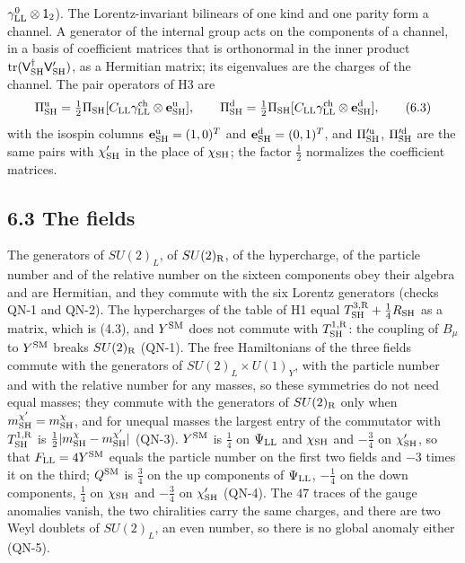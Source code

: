 \documentclass[
  10pt,
]{article}
\begin{document}
\(\gamma^0_{\rm LL}\otimes\mathsf 1_2\)). The Lorentz-invariant
bilinears of one kind and one parity form a channel. A generator of the
internal group acts on the components of a channel, in a basis of
coefficient matrices that is orthonormal in the inner product
\(\mathrm{tr}(\mathsf V^\dagger_{\rm SH}\mathsf V'_{\rm SH})\), as a
Hermitian matrix; its eigenvalues are the charges of the channel. The
pair operators of H3 are
\[\Pi^{\rm u}_{\rm SH}=\tfrac12\Pi_{\rm SH}[C_{\rm LL}\gamma^{\rm ch}_{\rm LL}\otimes\mathbf e^{\rm u}_{\rm SH}],\qquad
\Pi^{\rm d}_{\rm SH}=\tfrac12\Pi_{\rm SH}[C_{\rm LL}\gamma^{\rm ch}_{\rm LL}\otimes\mathbf e^{\rm d}_{\rm SH}],\tag{6.3}\]
with the isospin columns \(\mathbf e^{\rm u}_{\rm SH}=(1,0)^T\) and
\(\mathbf e^{\rm d}_{\rm SH}=(0,1)^T\), and \(\Pi'^{\rm u}_{\rm SH}\),
\(\Pi'^{\rm d}_{\rm SH}\) are the same pairs with \(\chi'_{\rm SH}\) in
the place of \(\chi_{\rm SH}\); the factor \(\tfrac12\) normalizes the
coefficient matrices.

\hypertarget{the-fields}{%
\subsection{6.3 The fields}\label{the-fields}}

The generators of \(SU(2)_L\), of \(SU(2)_{\rm R}\), of the hypercharge,
of the particle number and of the relative number on the sixteen
components obey their algebra and are Hermitian, and they commute with
the six Lorentz generators (checks QN-1 and QN-2). The hypercharges of
the table of H1 equal \(T^{3,{\rm R}}_{\rm SH}+\tfrac14R_{\rm SH}\) as a
matrix, which is (4.3), and \(Y^{\rm SM}\) does not commute with
\(T^{1,{\rm R}}_{\rm SH}\): the coupling of \(B_\mu\) to \(Y^{\rm SM}\)
breaks \(SU(2)_{\rm R}\) (QN-1). The free Hamiltonians of the three
fields commute with the generators of \(SU(2)_L\times U(1)_Y\), with the
particle number and with the relative number for any masses, so these
symmetries do not need equal masses; they commute with the generators of
\(SU(2)_{\rm R}\) only when \(m^{\chi'}_{\rm SH}=m^\chi_{\rm SH}\), and
for unequal masses the largest entry of the commutator with
\(T^{1,{\rm R}}_{\rm SH}\) is
\(\tfrac12\lvert m^\chi_{\rm SH}-m^{\chi'}_{\rm SH}\rvert\) (QN-3).
\(Y^{\rm SM}\) is \(\tfrac14\) on \(\Psi_{\rm LL}\) and
\(\chi_{\rm SH}\) and \(-\tfrac34\) on \(\chi'_{\rm SH}\), so that
\(F_{\rm LL}=4Y^{\rm SM}\) equals the particle number on the first two
fields and \(-3\) times it on the third; \(Q^{\rm SM}\) is \(\tfrac34\)
on the up components of \(\Psi_{\rm LL}\), \(-\tfrac14\) on the down
components, \(\tfrac14\) on \(\chi_{\rm SH}\) and \(-\tfrac34\) on
\(\chi'_{\rm SH}\) (QN-4). The \(47\) traces of the gauge anomalies
vanish, the two chiralities carry the same charges, and there are two
Weyl doublets of \(SU(2)_L\), an even number, so there is no global
anomaly either (QN-5).
\end{document}
